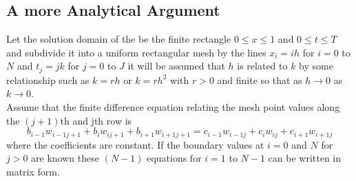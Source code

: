 \subsection{A more Analytical Argument}
Let the solution domain of the  be the finite rectangle $0\leq x \leq 1$ and
$0\leq t \leq T$ and subdivide it into a uniform rectangular mesh by the lines
$x_i=ih$ for $i=0$ to $N$ and $t_{j}=jk$ for $j=0$ to $J$ it will be assumed that $h$ is related to $k$ by some relationship such as $k=rh$ or $k=rh^2$ with $r>0$ and finite so that as $h\rightarrow 0$ as $k \rightarrow 0$.\\
Assume that the finite difference equation relating the mesh point values along the $(j+1)$th and jth row is 
\[b_{i-1}w_{i-1j+1}+
b_{i}w_{ij+1}+
b_{i+1}w_{i+1j+1}
=
c_{i-1}w_{i-1j}+
c_{i}w_{ij}+
c_{i+1}w_{i+1j}\]
where the coefficients are constant. If the boundary values at $i=0$ and $N$ for $j>0$ are known these $(N-1)$ equations for $i=1$ to $N-1$ can be written in 
matrix form.
